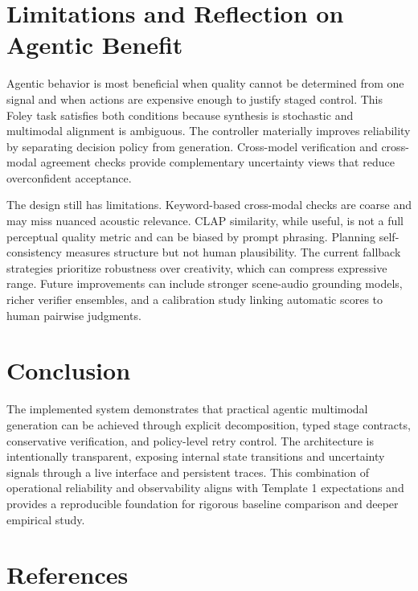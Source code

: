 \documentclass[12pt]{article}
\begin{document}
\section{Limitations and Reflection on Agentic Benefit}

Agentic behavior is most beneficial when quality cannot be determined from one signal and when actions are expensive enough to justify staged control. This Foley task satisfies both conditions because synthesis is stochastic and multimodal alignment is ambiguous. The controller materially improves reliability by separating decision policy from generation. Cross-model verification and cross-modal agreement checks provide complementary uncertainty views that reduce overconfident acceptance.

The design still has limitations. Keyword-based cross-modal checks are coarse and may miss nuanced acoustic relevance. CLAP similarity, while useful, is not a full perceptual quality metric and can be biased by prompt phrasing. Planning self-consistency measures structure but not human plausibility. The current fallback strategies prioritize robustness over creativity, which can compress expressive range. Future improvements can include stronger scene-audio grounding models, richer verifier ensembles, and a calibration study linking automatic scores to human pairwise judgments.

\section{Conclusion}

The implemented system demonstrates that practical agentic multimodal generation can be achieved through explicit decomposition, typed stage contracts, conservative verification, and policy-level retry control. The architecture is intentionally transparent, exposing internal state transitions and uncertainty signals through a live interface and persistent traces. This combination of operational reliability and observability aligns with Template 1 expectations and provides a reproducible foundation for rigorous baseline comparison and deeper empirical study.

\section{References}
\end{document}
